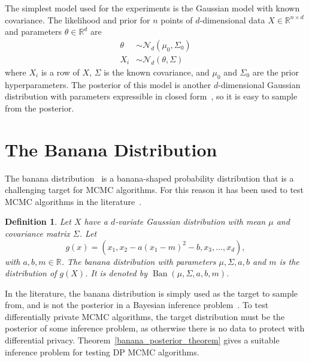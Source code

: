 \documentclass[english,twoside,openright]{HYgraduMLDS}
\newtheorem{definition}{Definition}
\newcommand{\R}{\mathbb{R}}
\newcommand{\caln}{{\mathcal{N}}}
\DeclareMathOperator{\ban}{Ban}
\begin{document}
The simplest model used for the experiments is the Gaussian model with
known covariance. The likelihood and prior for \(n\) points of \(d\)-dimensional
data \(X \in \R^{n\times d}\) and parameters \(\theta\in \R^{d}\) are
\begin{align*}
  \theta &\sim \caln_{d}(\mu_{0}, \Sigma_{0}) \\
  X_{i} &\sim \caln_{d}(\theta, \Sigma)
\end{align*}
where \(X_{i}\) is a row of \(X\), \(\Sigma\) is the known covariance,
and \(\mu_{0}\) and \(\Sigma_{0}\) are the prior hyperparameters.
The posterior of this model is another \(d\)-dimensional Gaussian distribution
with parameters expressible in closed form~\cite[Section 3.5]{BDA},
so it is easy to sample from the posterior.

\section{The Banana Distribution}\label{banana_section}

The banana distribution~\cite{TPK14} is a banana-shaped probability
distribution that is a challenging target for MCMC algorithms. For this reason it has
been used to test MCMC algorithms in the literature~\cite{TPK14}.

\begin{definition}
    Let \(X\) have a \(d\)-variate Gaussian distribution with
    mean \(\mu\) and covariance matrix \(\Sigma\). Let
    \[
        g(x) = (x_1, x_2 - a(x_1 - m)^2 - b, x_3, \dotsc, x_d),
    \]
    with \(a, b, m \in \R\).
    The banana distribution with parameters \(\mu, \Sigma, a, b\) and \(m\)
    is the distribution of \(g(X)\). It is denoted by
    \(\ban(\mu, \Sigma, a, b, m)\).
\end{definition}

In the literature, the banana distribution is simply used as the target to
sample from, and is not the posterior in a Bayesian inference
problem~\cite{TPK14}. To test differentially private MCMC algorithms, the
target distribution must be the posterior of some inference problem, as
otherwise there is no data to protect with differential privacy.
Theorem~\ref{banana_posterior_theorem} gives a suitable inference problem
for testing DP MCMC algorithms.
\end{document}
